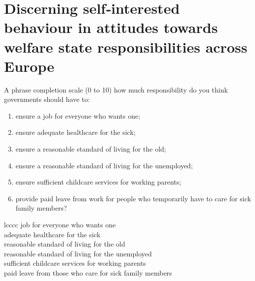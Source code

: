 \section{Discerning self‐interested behaviour in attitudes towards welfare state responsibilities across Europe \cite{baslevent_discerning_2011}}
A phrase completion scale (0 to 10)
 how much responsibility do you think governments should have to:
\begin{enumerate}
\item  ensure a job for everyone who wants one; 
\item  ensure adequate healthcare for the sick;
\item  ensure a reasonable standard of living for the old; 
\item  ensure a reasonable standard of living for the unemployed;
\item  ensure sufficient childcare services for working parents; 
\item  provide paid leave from work for people who  temporarily have to care for sick family members?
\end{enumerate}




\begin{deluxetable}{lcccc}
\centering
\tabletypesize{\footnotesize}
\tablewidth{0pt}
 \startdata 
 job for everyone who wants one \\
  adequate healthcare for the sick  \\
  reasonable standard of living for the old\\
  reasonable standard of living for the unemployed\\
  sufficient childcare services for working parents\\
  paid leave from those who care for sick family members\\
 \enddata
 
\end{deluxetable}

